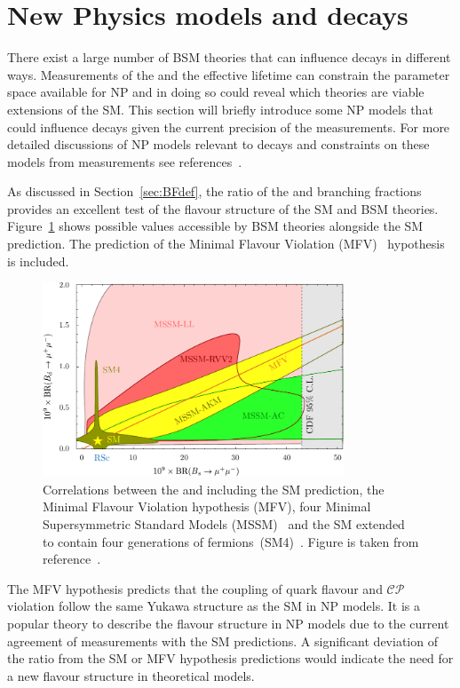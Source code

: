 \section[New Physics models and \bmumu decays]{New Physics models and \boldmath{\bmumu} decays}
\label{sec:NPmodels}
There exist a large number of BSM theories that can influence \bmumu decays in different ways. Measurements of the \bmumu \BFs and the \bsmumu effective lifetime can constrain the parameter space available for NP and in doing so could reveal which theories are viable extensions of the SM. This section will briefly introduce some NP models that could influence \bmumu decays given the current precision of the \BF measurements. %
For more detailed discussions of NP models relevant to \bmumu decays and constraints on these models from measurements see references~\cite{Buras:2013uqa,Knegjens:2014zva,Altmannshofer:2014rta}.

As discussed in Section~\ref{sec:BFdef}, the ratio of the \bdmumu and \bsmumu branching fractions provides an excellent test of the flavour structure of the SM and BSM theories. %
Figure~\ref{fig:ratio} shows possible values accessible by BSM theories alongside the SM prediction. The prediction of the Minimal Flavour Violation (MFV)~\cite{DAmbrosio:2002vsn} hypothesis is included. %
\begin{figure}[tbp]
    \centering
        \includegraphics[width=0.8\textwidth]{./Figs/Theory/MFV.pdf}
    \caption{Correlations between the \bdmumu and \bsmumu \BFs including the SM prediction, the Minimal Flavour Violation hypothesis (MFV), four Minimal Supersymmetric Standard Models (MSSM)~\cite{Martin:1997ns} and the SM extended to contain four generations of fermions~(SM4)~\cite{Hou:2008xd}. Figure is taken from reference~\cite{Straub:2010ih}.}
    \label{fig:ratio}
\end{figure}
The MFV hypothesis predicts that the coupling of quark flavour and $\mathcal{CP}$ violation follow the same Yukawa structure as the SM in NP models. It is a popular theory to describe the flavour structure in NP models due to the current agreement of measurements with the SM predictions. A significant deviation of the \BF ratio from the SM or MFV hypothesis predictions would indicate the need for a new flavour structure in theoretical models.

